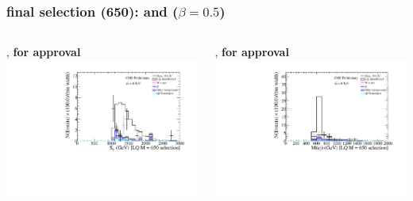 \documentclass[bigger]{beamer}
\providecommand{\alert}[1]{\textbf{#1}}
\begin{document}
\begin{frame}
\frametitle{\enujj final selection (650): \ST and \mej ($\beta = 0.5$)}
\label{sec-3-4-3}
\begin{columns}
\begin{column}{0.6\textwidth}
\label{sec-3-4-3-1}

\centering
\ST, \alert{for approval}
\includegraphics[width=\textwidth]{fig/enu/finalSelection/sT_LQ650_enujj.pdf}
\end{column}
\begin{column}{0.6\textwidth}
\label{sec-3-4-3-2}

\centering
\mej, \alert{for approval}
\includegraphics[width=\textwidth]{fig/enu/finalSelection/Mej_LQ650_enujj.pdf}
\end{column}
\end{columns}
\end{frame}
\end{document}
